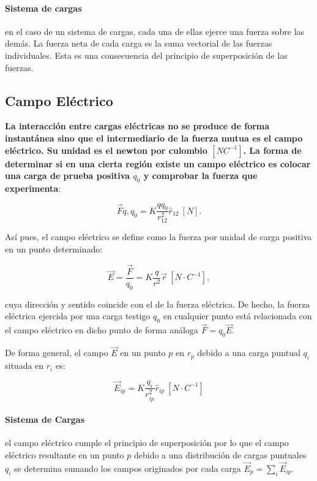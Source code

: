\documentclass{tufte-handout}
\begin{document}
\paragraph{Sistema de cargas} en el caso de un sistema de cargas, cada una de ellas ejerce una fuerza sobre las demás. La fuerza neta de cada carga es la suma vectorial de las fuerzas individuales. Esta es una consecuencia del principio de superposición de las fuerzas.

\newpage

\subsection{Campo Eléctrico}

\textbf{La interacción entre cargas eléctricas no se produce de forma instantánea sino que el intermediario de la fuerza mutua es el campo eléctrico. Su unidad es el newton por culombio $[NC^{-1}]$. La forma de determinar si en una cierta región existe un campo eléctrico es colocar una carga de prueba positiva $q_0$ y comprobar la fuerza que experimenta}:

\begin{equation}
\vec{F}{q,q_0} = K\frac{q q_0}{r^2_{12}}\hat{r}_{12}~[N].
\end{equation}

Así pues, el campo eléctrico se define como la fuerza por unidad de carga positiva en un punto determinado:

\begin{equation}
\vec{E} = \frac{\vec{F}}{q_0} = K \frac{q}{r^2}{\vec{r}}~[N\cdot C^{-1}],
\end{equation}

cuya dirección y sentido coincide con el de la fuerza eléctrica. De hecho, la fuerza eléctrica ejercida por una carga testigo $q_0$ en cualquier punto está relacionada con el campo eléctrico en dicho punto de forma análoga $\vec{F} = q_0\vec{E}$.

De forma general, el campo $\vec{E}$ en un punto $p$ en $r_p$ debido a una carga puntual $q_i$ situada en $r_i$ es:

\begin{equation}
\vec{E}_{ip} = K \frac{q_i}{r^2_{ip}}\hat{r}_{ip}~[N\cdot C^{-1}]
\end{equation}

\paragraph{Sistema de Cargas} el campo eléctrico cumple el principio de superposición por lo que el campo eléctrico resultante en un punto $p$ debido a una distribución de cargas puntuales $q_i$ se determina sumando los campos originados por cada carga $\vec{E}_p = \sum_i \vec{E}_{ip}$.
\end{document}
